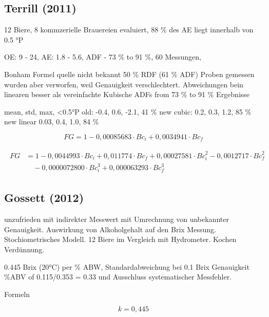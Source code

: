 \documentclass[a4paper,parskip=half]{scrartcl}
\newcommand{\bxic}{\mathit{Bc}_i}
\newcommand{\bxfc}{\mathit{Bc}_f}
\newcommand{\fg}{\mathit{FG}}
\begin{document}
\subsection*{Terrill (2011)}

12 Biere, 8 kommzerielle Brauereien evaluiert, 88 \% des AE liegt innerhalb
von 0.5 °P
\autocite{Terrill2013}

OE: 9 - 24, AE: 1.8 - 5.6, ADF - 73 \% to 91 \%, 60 Messungen,
\autocite{Terrill2010}


Bonham Formel quelle nicht bekannt
50 \% RDF (61 \% ADF) Proben gemessen wurden aber verworfen, weil
Genauigkeit verschlechtert.
Abweichungen bein linearen besser als vereinfachte Kubische
ADFs from 73 \% to 91 \% Ergebnisse
\autocite{Terrill2011}

mean, std, max, <0.5°P
old: -0.4, 0.6, -2.1, 41 \%
new cubic: 0.2, 0.3, 1.2, 85 \%
new linear 0.03, 0.4, 1.0, 84 \%

\autocite{Terrill2011}


\begin{equation}
\fg = 1 - 0,00085683 \cdot \bxic + 0,0034941 \cdot \bxfc
\label{eq:terrilllinear} 
\end{equation}

\begin{align}
\begin{split}
\fg &= 1 - 0,0044993 \cdot \bxic + 0,011774 \cdot \bxfc + 0,00027581 \cdot \bxic^2 - 0,0012717 \cdot \bxfc^2 \\
& \quad  - 0,0000072800 \cdot \bxic^3  + 0,000063293 \cdot \bxfc^3
\end{split} \label{eq:terrillcubic} 
\end{align}

\subsection*{Gossett (2012)}

unzufrieden mit indirekter Messwert mit Umrechnung von
unbekannter Genauigkeit.
Auswirkung von Alkoholgehalt auf den Brix Messung.
Stochiometrisches Modell. 12 Biere im Vergleich mit
Hydrometer. Kochen Verdünnung.
\autocite{Gossett2012}

0.445 Brix (20°C) per \% ABW, 
Standardabweichung bei 0.1 Brix Genauigkeit  \%ABV of 0.115/0.353 = 0.33
und Ausschluss systematischer Messfehler.
\autocite{Gossett2012a}

Formeln
\autocite{Gossett2012b}

\begin{equation}
k = 0,445
\end{equation}
\end{document}
